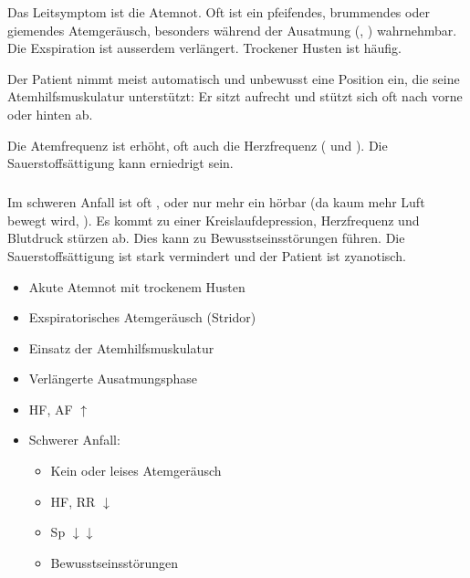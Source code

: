 {%
Das Leitsymptom ist die Atemnot. Oft ist ein pfeifendes,
brummendes oder giemendes Atemgeräusch, besonders während
der Ausatmung (, ) wahrnehmbar. Die Exspiration ist ausserdem
verlängert. Trockener Husten ist häufig.

Der Patient nimmt meist automatisch und unbewusst eine
Position ein, die seine Atemhilfsmuskulatur unterstützt: Er
sitzt aufrecht und stützt sich oft nach vorne oder hinten
ab.

Die Atemfrequenz ist erhöht, oft auch die Herzfrequenz
( und ). Die Sauerstoffsättigung
kann erniedrigt sein.

\subparagraph{}

Im schweren Anfall ist oft , oder nur mehr ein
 hörbar (da kaum mehr Luft bewegt
wird, ). Es kommt zu einer
Kreislaufdepression, Herzfrequenz und Blutdruck stürzen ab.
Dies kann zu Bewusstseinsstörungen führen. Die
Sauerstoffsättigung ist stark vermindert und der Patient ist
zyanotisch.


}{
\begin{itemize}
  \item Akute Atemnot mit trockenem Husten
  \item Exspiratorisches Atemgeräusch (Stridor)
  \item Einsatz der Atemhilfsmuskulatur
  \item Verlängerte Ausatmungsphase
  \item HF, AF $\uparrow$
  \item Schwerer Anfall:
  \begin{itemize}
    \item Kein oder leises Atemgeräusch
    \item HF, RR $\downarrow$
    \item Sp $\downarrow\downarrow$
    \item Bewusstseinsstörungen
  \end{itemize}
\end{itemize}
}
{}
{}
{}

% 


